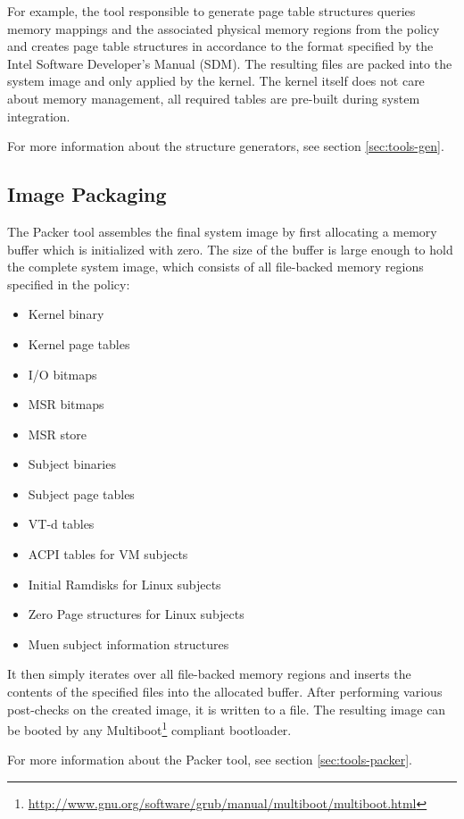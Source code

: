 \documentclass[a4paper,twoside,titlepage]{article}
\begin{document}
For example, the tool responsible to generate page table structures queries
memory mappings and the associated physical memory regions from the policy and
creates page table structures in accordance to the format specified by the
Intel Software Developer's Manual (SDM). The resulting files are packed into
the system image and only applied by the kernel. The kernel itself does not
care about memory management, all required tables are pre-built during system
integration.

For more information about the structure generators, see section
\ref{sec:tools-gen}.

\subsection{Image Packaging}
The Packer tool assembles the final system image by first allocating a memory
buffer which is initialized with zero. The size of the buffer is large enough
to hold the complete system image, which consists of all file-backed memory
regions specified in the policy:

\begin{itemize}
	\item Kernel binary
	\item Kernel page tables
	\item I/O bitmaps
	\item MSR bitmaps
	\item MSR store
	\item Subject binaries
	\item Subject page tables
	\item VT-d tables
	\item ACPI tables for VM subjects
	\item Initial Ramdisks for Linux subjects
	\item Zero Page structures for Linux subjects
	\item Muen subject information structures
\end{itemize}

It then simply iterates over all file-backed memory regions and inserts the
contents of the specified files into the allocated buffer. After performing
various post-checks on the created image, it is written to a file. The
resulting image can be booted by any
Multiboot\footnote{\url{http://www.gnu.org/software/grub/manual/multiboot/multiboot.html}}
compliant bootloader.

For more information about the Packer tool, see section \ref{sec:tools-packer}.
\end{document}

